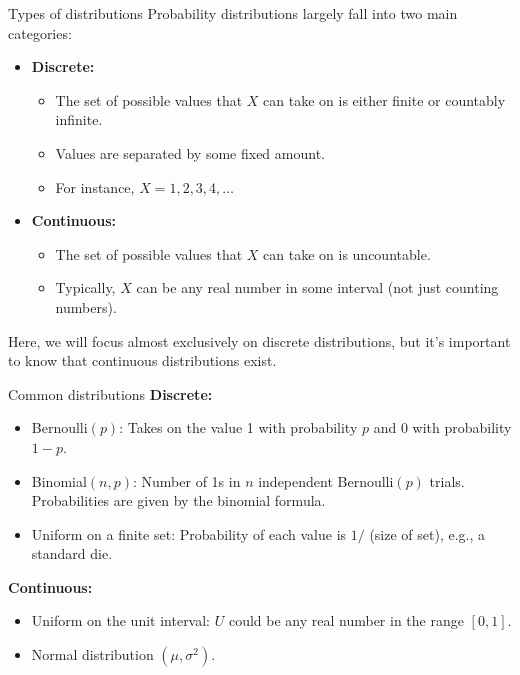 \documentclass[aspectratio=169]{../latex_main/tntbeamer}  %
\begin{document}
\begin{frame}{Types of distributions}
    Probability distributions largely fall into two main categories:
    \begin{itemize}
        \item \textbf{Discrete:} 
        \begin{itemize}
            \item The set of possible values that $X$ can take on is either finite or countably infinite.
            \item Values are separated by some fixed amount. 
            \item For instance, $X=1,2,3,4,\ldots$
        \end{itemize} 
        \item \textbf{Continuous:} 
        \begin{itemize}
            \item The set of possible values that $X$ can take on is uncountable.
            \item Typically, $X$ can be any real number in some interval (not just counting numbers).
        \end{itemize} 
    \end{itemize}
    Here, we will focus almost exclusively on discrete distributions, but it’s important to know that continuous distributions exist.
\end{frame}

\begin{frame}{Common distributions}
    \textbf{Discrete:}
    \begin{itemize}
        \item Bernoulli$(p)$: Takes on the value 1 with probability $p$ and 0 with probability $1 - p$.
        \item Binomial$(n, p)$: Number of 1s in $n$ independent Bernoulli$(p)$ trials. Probabilities are given by the binomial formula.
        \item Uniform on a finite set: Probability of each value is $1 /$ (size of set), e.g., a standard die.
    \end{itemize}

    \textbf{Continuous:}
    \begin{itemize}
        \item Uniform on the unit interval: $U$ could be any real number in the range $[0, 1]$.
        \item Normal distribution $(\mu, \sigma^2)$.
    \end{itemize}
\end{frame}
\end{document}
